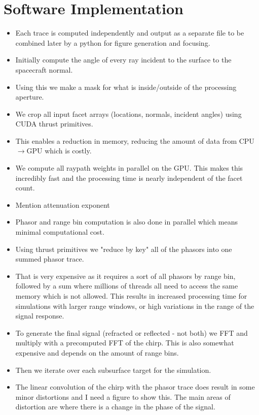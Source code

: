 \documentclass[lettersize,journal]{IEEEtran}
\begin{document}
\section{Software Implementation}\label{sec:Software}

\begin{itemize}
    \item Each trace is computed independently and output as a separate file to be combined later by a python for figure generation and focusing.
    \item Initially compute the angle of every ray incident to the surface to the spacecraft normal. 
    \item Using this we make a mask for what is inside/outside of the processing aperture. 
    \item We crop all input facet arrays (locations, normals, incident angles) using CUDA thrust primitives. \cite{bell_thrust_2012}
    \item This enables a reduction in memory, reducing the amount of data from CPU$\rightarrow$GPU which is costly. 
    \item We compute all raypath weights in parallel on the GPU. This makes this incredibly fast and the processing time is nearly independent of the facet count. 
    \item Mention attenuation exponent
    \item Phasor and range bin computation is also done in parallel which means minimal computational cost.
    \item Using thrust primitives we "reduce by key" all of the phasors into one summed phasor trace.
    \item That is very expensive as it requires a sort of all phasors by range bin, followed by a sum where millions of threads all need to access the same memory which is not allowed. This results in increased processing time for simulations with larger range windows, or high variations in the range of the signal response. 
    \item To generate the final signal (refracted or reflected - not both) we FFT and multiply with a precomputed FFT of the chirp. This is also somewhat expensive and depends on the amount of range bins.
    \item Then we iterate over each subsurface target for the simulation.
    \item The linear convolution of the chirp with the phasor trace does result in some minor distortions and I need a figure to show this. The main areas of distortion are where there is a change in the phase of the signal.
\end{itemize}
\end{document}
